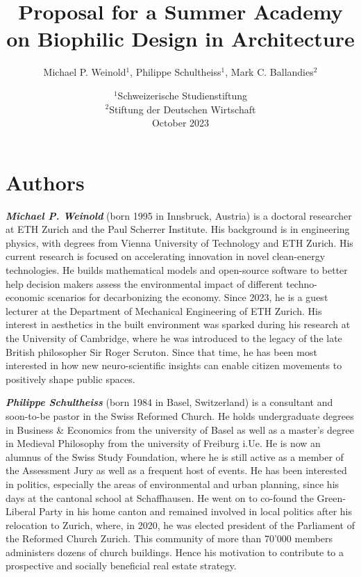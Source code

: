 \documentclass[a4paper]{article}
\title{Proposal for a Summer Academy \protect\\ on Biophilic Design in Architecture}
\author{Michael P. Weinold$^1$, Philippe Schultheiss$^1$, Mark C. Ballandies$^2$}
\date{
    $^1$Schweizerische Studienstiftung \\
    $^2$Stiftung der Deutschen Wirtschaft \\[3mm]
    October 2023
}
\begin{document}


\maketitle

\section*{\centering Authors}
\vspace{-10mm}


\textbf{\textit{Michael P. Weinold}} (born 1995 in Innsbruck, Austria) is a doctoral researcher at ETH Zurich and the Paul Scherrer Institute. His background is in engineering physics, with degrees from Vienna University of Technology and ETH Zurich. His current research is focused on accelerating innovation in novel clean-energy technologies. He builds mathematical models and open-source software to better help decision makers assess the environmental impact of different techno-economic scenarios for decarbonizing the economy. Since 2023, he is a guest lecturer at the Department of Mechanical Engineering of ETH Zurich. His interest in aesthetics in the built environment was sparked during his research at the University of Cambridge, where he was introduced to the legacy of the late British philosopher Sir Roger Scruton. Since that time, he has been most interested in how new neuro-scientific insights can enable citizen movements to positively shape public spaces.

\textbf{\textit{Philippe Schultheiss}} (born 1984 in Basel, Switzerland) is a consultant and soon-to-be pastor in the Swiss Reformed Church. He holds undergraduate degrees in Business \& Economics from the university of Basel as well as a master's degree in Medieval Philosophy from the university of Freiburg i.Ue. He is now an alumnus of the Swiss Study Foundation, where he is still active as a member of the Assessment Jury as well as a frequent host of events. He has been interested in politics, especially the areas of environmental and urban planning, since his days at the cantonal school at Schaffhausen. He went on to co-found the Green-Liberal Party in his home canton and remained involved in local politics after his relocation to Zurich, where, in 2020, he was elected president of the Parliament of the Reformed Church Zurich. This community of more than 70'000 members administers dozens of church buildings. Hence his motivation to contribute to a prospective and socially beneficial real estate strategy.
\end{document}
